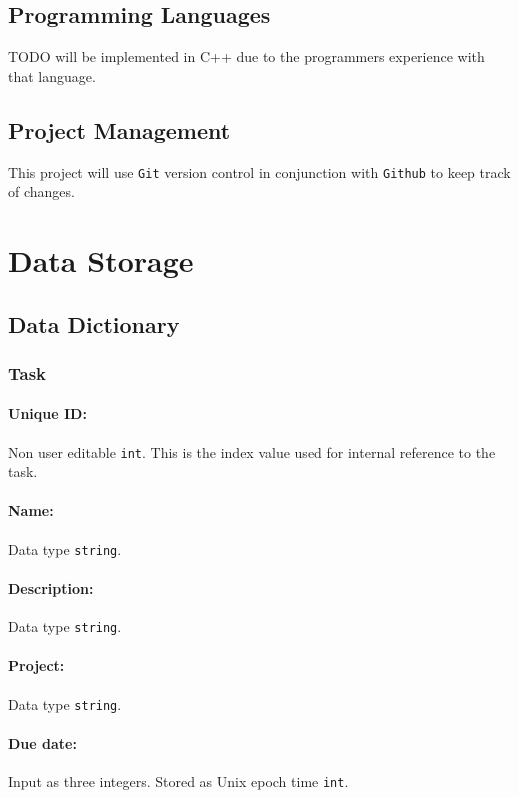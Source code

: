 \documentclass[12pt]{article}
\newcommand{\e}[1] {{\tt #1}}
\begin{document}
\subsection{Programming Languages}
TODO will be implemented in C++ due to the programmers experience with that language.

\subsection{Project Management}
This project will use {\tt Git} version control in conjunction with {\tt Github} to keep track of changes.

\section{Data Storage}\label{sec:Data Storage}
\subsection{}

\subsection{Data Dictionary}\label{sec:Data Dictionary}
\subsubsection{Task} \label{sec:Task}
\paragraph{Unique ID:} Non user editable \e{int}. This is the index value used for internal reference to the task. 
\paragraph{Name:} Data type \e{string}.
\paragraph{Description:} Data type \e{string}.
\paragraph{Project:} Data type \e{string}.
\paragraph{Due date:} Input as three integers. Stored as Unix epoch time \e{int}.
\end{document}
